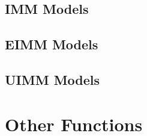 \subsection{IMM Models}









\subsection{EIMM Models}







\subsection{UIMM Models}









\section{Other Functions}




















